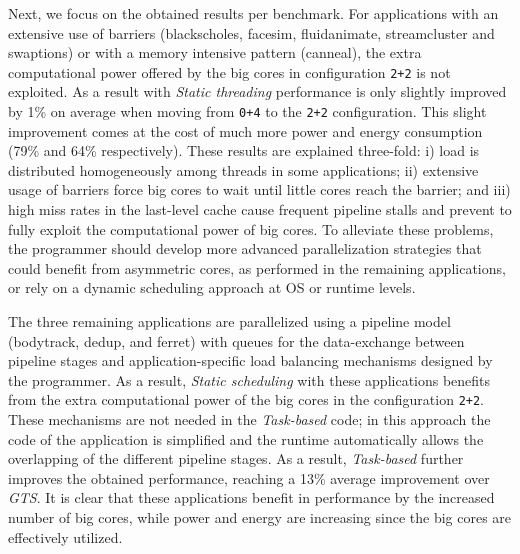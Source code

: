 Next, we focus on the obtained results per benchmark. For applications with an extensive use of barriers (blackscholes, facesim, fluidanimate, streamcluster and swaptions) or with a memory intensive pattern (canneal), the extra computational power offered by the big cores in configuration \texttt{2+2} is not exploited. As a result with \emph{Static threading} performance is only slightly improved by 1\% on average when moving from \texttt{0+4} to the \texttt{2+2} configuration. This slight improvement comes at the cost of much more power and energy consumption (79\% and 64\% respectively).
These results are explained three-fold: i) load is distributed homogeneously among threads in some applications; ii) extensive usage of barriers force big cores to wait until little cores reach the barrier; and iii) high miss rates in the last-level cache cause frequent pipeline stalls and prevent to fully exploit the computational power of big cores. To alleviate these problems, the programmer should develop more advanced parallelization strategies that could benefit from asymmetric cores, as performed in the remaining applications, or rely on a dynamic scheduling approach at OS or runtime levels.

The three remaining applications are parallelized using a pipeline model (bodytrack, dedup, and ferret)  with queues for the data-exchange between pipeline stages and application-specific load balancing mechanisms designed by the programmer. As a result, \emph{Static scheduling} with these applications benefits from the extra computational power of the big cores in the configuration \texttt{2+2}. These mechanisms are not needed in the \emph{Task-based} code; in this approach the code of the application is simplified and the runtime automatically allows the overlapping of the different pipeline stages. As a result, \emph{Task-based} further improves the obtained performance, reaching a 13\% average improvement over \emph{GTS}. It is clear that these applications benefit in performance by the increased number of big cores, while power and energy are increasing since the big cores are effectively utilized.


